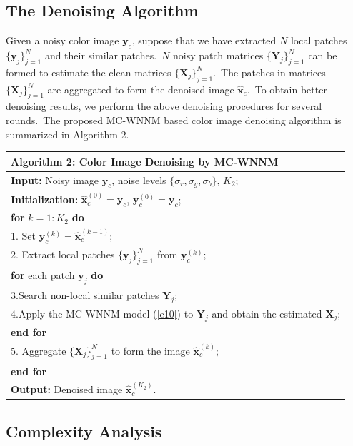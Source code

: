 \subsection{The Denoising Algorithm}

Given a noisy color image $\mathbf{y}_{c}$, suppose that we have extracted $N$ local patches $\{\mathbf{y}_{j}\}_{j=1}^{N}$ and their similar patches.\ $N$ noisy patch matrices $\{\mathbf{Y}_{j}\}_{j=1}^{N}$ can be formed to estimate the clean matrices $\{\mathbf{X}_{j}\}_{j=1}^{N}$.\ The patches in matrices $\{\mathbf{X}_{j}\}_{j=1}^{N}$ are aggregated to form the denoised  image $\hat{\mathbf{x}}_{c}$.\ To obtain better denoising results, we perform the above denoising procedures for several rounds.\ The proposed MC-WNNM based color image denoising algorithm is summarized in Algorithm 2.
\begin{table}
\begin{tabular}{l}
\hline
\textbf{Algorithm 2}: Color Image Denoising by MC-WNNM
\\
\hline
\textbf{Input:} Noisy image $\mathbf{y}_{c}$, noise levels $\{\sigma_{r}, \sigma_{g}, \sigma_{b}\}$, $K_{2}$;
\\
\textbf{Initialization:} $\hat{\mathbf{x}}_{c}^{(0)}=\mathbf{y}_{c}$, $\mathbf{y}_{c}^{(0)}=\mathbf{y}_{c}$;
\\
\textbf{for} $k = 1:K_{2}$ \textbf{do}
\\
1. Set $\mathbf{y}_{c}^{(k)}=\hat{\mathbf{x}}_{c}^{(k-1)}$;
\\
2. Extract local patches $\{\mathbf{y}_{j}\}_{j=1}^{N}$ from $\mathbf{y}_{c}^{(k)}$;
\\
\quad\textbf{for} each patch $\mathbf{y}_{j}$ \textbf{do}
\\
3.\quad Search non-local similar patches $\mathbf{Y}_{j}$;
\\
4.\quad Apply the MC-WNNM model (\ref{e10}) to $\mathbf{Y}_{j}$ and obtain the estimated $\mathbf{X}_{j}$;
\\
\quad\textbf{end for}
\\
5. Aggregate $\{\mathbf{X}_{j}\}_{j=1}^{N}$ to form the image $\hat{\mathbf{x}}_{c}^{(k)}$;
\\
\textbf{end for}
\\
\textbf{Output:} Denoised image $\hat{\mathbf{x}}_{c}^{(K_{2})}$.
\\
\hline
\end{tabular}
\label{a4-2}
\end{table}


\subsection{Complexity Analysis}

